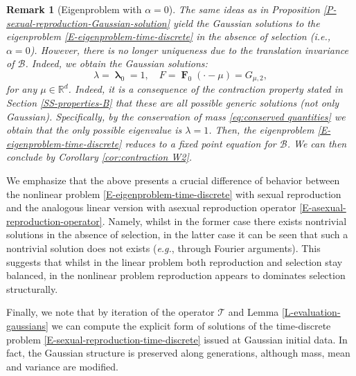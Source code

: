 \documentclass[reqno]{amsart}
\newtheorem{remark}[definition]{Remark}
\DeclareMathOperator{\blambda}{\boldsymbol{\lambda}}
\DeclareMathOperator{\bF}{\boldsymbol{F}}
\numberwithin{equation}{section}
\begin{document}
{\begin{remark}[Eigenproblem with $\alpha=0$]
The same ideas as in Proposition \ref{P-sexual-reproduction-Gaussian-solution} yield the Gaussian solutions to the eigenproblem \eqref{E-eigenproblem-time-discrete} in the absence of selection ({\em i.e.}, $\alpha=0$). However, there is no longer uniqueness due to the translation invariance of $\mathcal{B}$. Indeed, we obtain the Gaussian solutions:
$$\lambda=\blambda_0=1,\quad F=\bF_0(\cdot-\mu)=G_{\mu,2},$$
for any $\mu\in \mathbb{R}^d$. Indeed, it is a consequence of the contraction property stated in Section \ref{SS-properties-B} that these are all possible generic solutions (not only Gaussian). Specifically, by the conservation of mass \eqref{eq:conserved quantities} we obtain that the only possible eigenvalue is $\lambda=1$. Then, the eigenproblem \eqref{E-eigenproblem-time-discrete} reduces to a fixed point equation for $\mathcal{B}$. We can then conclude by Corollary \ref{cor:contraction W2}.
\end{remark}

We emphasize that the above presents a crucial difference of behavior between the nonlinear problem \eqref{E-eigenproblem-time-discrete} with sexual reproduction and the analogous linear version with asexual reproduction operator \eqref{E-asexual-reproduction-operator}. Namely, whilst in the former case there exists nontrivial solutions in the absence of selection, in the latter case it can be seen that such a nontrivial solution does not exists ({\em e.g.}, through Fourier arguments). This suggests that whilst in the linear problem both reproduction and selection stay balanced, in the nonlinear problem reproduction appears to dominates selection structurally. 


Finally, we note that by iteration of the operator $\mathcal{T}$ and Lemma \ref{L-evaluation-gaussians} we can compute the explicit form of solutions of the time-discrete problem \eqref{E-sexual-reproduction-time-discrete} issued at Gaussian initial data. In fact, the Gaussian structure is preserved along generations, although mass, mean and variance are modified.

}
\end{document}
